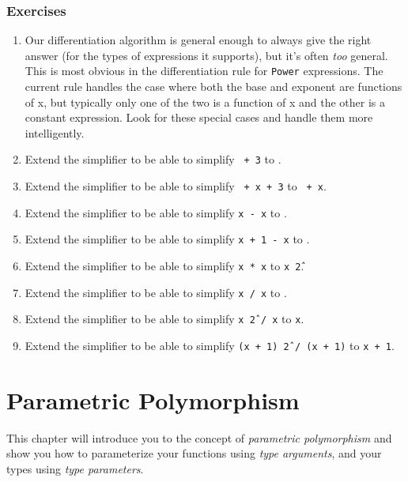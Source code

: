 \documentclass[10pt,oneside]{book}
\begin{document}
\subsection*{Exercises}
\begin{enumerate}
\item Our differentiation algorithm is general enough to always give the right answer (for the types of expressions it supports), but it's often {\em too} general. This is most obvious in the differentiation rule for \texttt{\frenchspacing Power} expressions. The current rule handles the case where both the base and exponent are functions of x, but typically only one of the two is a function of x and the other is a constant expression. Look for these special cases and handle them more intelligently. 

\item Extend the simplifier to be able to simplify \texttt{ + 3} to \texttt{}.

\item Extend the simplifier to be able to simplify \texttt{ + x + 3} to \texttt{ + x}.

\item Extend the simplifier to be able to simplify \texttt{\frenchspacing x - x} to \texttt{}.

\item Extend the simplifier to be able to simplify \texttt{\frenchspacing x + 1 - x} to \texttt{}.

\item Extend the simplifier to be able to simplify \texttt{\frenchspacing x * x} to \texttt{\frenchspacing x \^ 2}.

\item Extend the simplifier to be able to simplify \texttt{\frenchspacing x / x} to \texttt{}.

\item Extend the simplifier to be able to simplify \texttt{\frenchspacing x \^ 2 / x} to \texttt{\frenchspacing x}.

\item Extend the simplifier to be able to simplify \texttt{\frenchspacing (x + 1) \^ 2 / (x + 1)} to \texttt{\frenchspacing x + 1}.
\end{enumerate}

\chapter{Parametric Polymorphism}
This chapter will introduce you to the concept of {\em parametric polymorphism} and show you how to parameterize your functions using {\em type arguments}, and your types using {\em type parameters}. 
\end{document}
